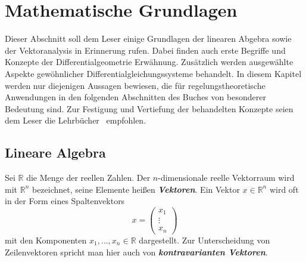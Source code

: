 \documentclass[a4paper,twoside,english,ngerman,deutsch,german,sectrefs,envcountsame,envcountchap]{svmono}
\begin{document}
\chapter{Mathematische Grundlagen\label{cha:Grundlagen}}
Dieser Abschnitt soll dem Leser einige Grundlagen der linearen Abgebra sowie der Vektoranalysis in Erinnerung rufen. Dabei finden auch erste Begriffe und Konzepte der Differentialgeometrie Erwähnung. Zusätzlich werden ausgewählte Aspekte gewöhnlicher Differentialgleichungssysteme behandelt. In diesem Kapitel werden nur diejenigen Aussagen bewiesen, die für regelungstheoretische Anwendungen in den folgenden Abschnitten des Buches von besonderer Bedeutung sind. Zur Festigung und Vertiefung der behandelten Konzepte seien dem Leser die Lehrbücher~\cite{arnold2001,kerner2007} empfohlen.

\section{Lineare Algebra\label{sec:Lineare-Algebra}}

Sei ${\mathbb{R}}$ die Menge der reellen Zahlen. Der $n$-dimensionale reelle Vektorraum wird mit ${\mathbb{R}}^{n}$ bezeichnet, seine Elemente heißen \textbf{\em Vektoren}. Ein Vektor $x\in{\mathbb{R}}^{n}$ wird oft in der Form eines Spaltenvektors
\begin{equation}
x=\left(\begin{array}{c} x_{1}\\
\vdots\\
x_{n}
\end{array}\right)\label{eq:vektor-x}
\end{equation}
mit den Komponenten $x_{1},\ldots,x_{n}\in{\mathbb{R}}$ dargestellt. Zur Unterscheidung von Zeilenvektoren spricht man hier auch von \textbf{\em kontravarianten Vektoren}.
\end{document}
